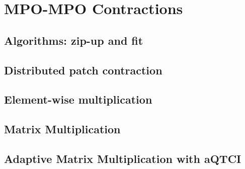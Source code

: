 \chapter{MPO-MPO Contractions}
\section{Algorithms: zip-up and fit}
\section{Distributed patch contraction}
\section{Element-wise multiplication}

\section{Matrix Multiplication}
\section{Adaptive Matrix Multiplication with aQTCI}


